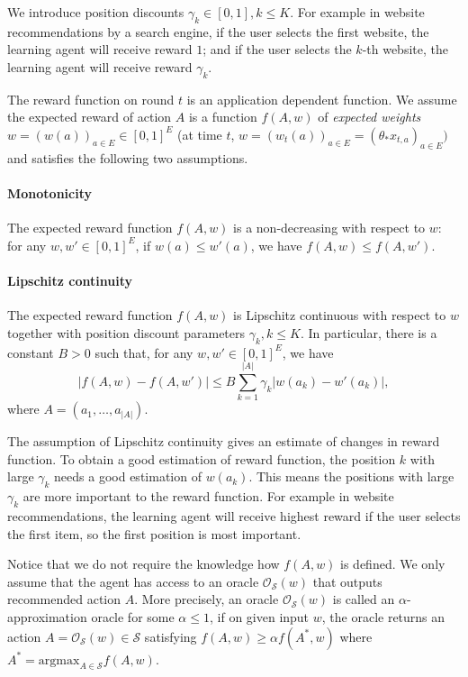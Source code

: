 \documentclass{article}
\newcommand{\cO}{\mathcal{O}}
\newcommand{\cS}{\mathcal{S}}
\newcommand{\argmax}{\mathrm{argmax}}
\begin{document}
We introduce position discounts $\gamma_k \in [0,1], k\leq K$. For example in website recommendations by a search engine, if the user selects the first website, the learning agent will receive reward $1$; and if the user selects the $k$-th website, the learning agent will receive reward $\gamma_k$.

The reward function on round $t$ is an application dependent function. We assume the expected reward of action $A$ is a function $f(A,w)$ of {\it expected weights} $w = (w(a))_{a \in E} \in [0,1]^{E}$ (at time $t$, $w = (w_t(a))_{a \in E} = (\theta_{\ast}x_{t,a})_{a \in E}) $ and satisfies the following two assumptions.

\paragraph{Monotonicity}
The expected reward function $f(A, w)$ is a non-decreasing with respect to $w$: for any $w,w'\in [0,1]^E$, if $w(a) \leq w'(a)$, we have $f(A, w) \leq f(A, w')$.

\paragraph{Lipschitz continuity}
The expected reward function $f(A, w)$ is Lipschitz continuous with respect to $w$ together with position discount parameters $\gamma_k, k\leq K$. In particular, there is a constant $B>0$ such that, for any $w,w' \in [0,1]^E$, we have
$$
	|f(A, w) - f(A, w')| \leq B \sum_{k=1}^{|A|} \gamma_k |w(a_k) - w'(a_k)|,
$$
where $A = (a_1, \ldots, a_{|A|})$.

The assumption of Lipschitz continuity gives an estimate of changes in reward function. To obtain a good estimation of reward function, the position $k$ with large $\gamma_k$ needs a good estimation of $w(a_k)$. This means the positions with large $\gamma_k$ are more important to the reward function. For example in website recommendations, the learning agent will receive highest reward if the user selects the first item, so the first position is most important. 

Notice that we do not require the knowledge how $f(A, w)$ is defined. We only assume that the agent has access to an oracle $\cO_{\cS}(w)$ that outputs recommended action $A$. More precisely, an oracle $\cO_{\cS}(w)$ is called an $\alpha$-approximation oracle for some $\alpha \leq 1$, if on given input $w$, the oracle returns an action $A = \cO_{\cS}(w) \in \cS$ satisfying $f(A,w) \geq \alpha f(A^*,w)$ where $A^* = \argmax_{A\in\cS} f(A, w)$.
\end{document}
